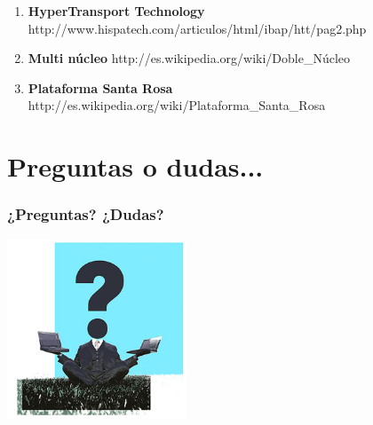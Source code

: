 {\begin{enumerate}
\item \textbf{HyperTransport Technology}\newline
http://www.hispatech.com/articulos/html/ibap/htt/pag2.php

\item \textbf{Multi núcleo}\newline
http://es.wikipedia.org/wiki/Doble\_Núcleo

\item \textbf{Plataforma Santa Rosa}\newline
http://es.wikipedia.org/wiki/Plataforma\_Santa\_Rosa
\end{enumerate}
}


\section*{Preguntas o dudas...}
\frame
{
\frametitle{¿Preguntas? ¿Dudas?}
\begin{center}
\includegraphics[width=0.4\textwidth]{imgs/preguntas.jpg}
\end{center}
}
